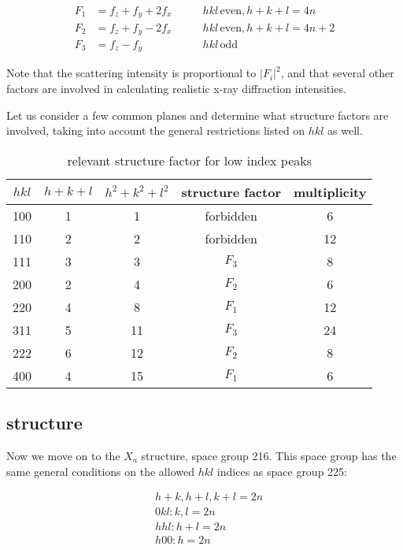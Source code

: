 \documentclass[aps,amsmath,amssymb,prb,superscriptaddress,longtable,preprint,fleqn]{revtex4}
\begin{document}
\begin{align}
F_1 &= f_z + f_y + 2f_x \qquad &hkl\,\text{even}, h+k+l = 4n\\
F_2 &= f_z+ f_y - 2f_x \qquad &hkl\,\text{even}, h+k+l = 4n+2\\
F_3 &= f_z - f_y \qquad &hkl\,\text{odd}
\end{align}

Note that the scattering intensity is proportional to $|F_i|^2$, and that several other factors are involved in calculating realistic x-ray diffraction intensities. 

Let us consider a few common planes and determine what structure factors are involved, taking into account the general restrictions listed on $hkl$ as well.

\begin{table}[htdp]
\begin{center}
\caption{relevant structure factor for low index peaks}
\begin{tabular}{ccccc}
$hkl$ & $h+k+l$ & $h^2+k^2+l^2$ & structure factor & multiplicity \\
\hline
100 & 1 & 1 & forbidden  & 6\\
110 & 2 & 2 & forbidden & 12 \\
111 & 3 & 3 & $F_3$ & 8\\
200 & 2 & 4 & $F_2$ & 6\\
220 & 4 & 8 & $F_1$ & 12\\
311 & 5 & 11 & $F_3$ & 24\\
222 & 6 & 12 & $F_2$ & 8\\
400 & 4 & 15 & $F_1$& 6
\end{tabular}
\end{center}
\label{low-index-l21}
\end{table}%

\clearpage 

\subsection{ structure}

Now we move on to the $X_a$ structure, space group 216. This space group has the same general conditions on the allowed $hkl$ indices as space group 225:

\begin{align*}
 &h+k, h+l, k+l=2n\\
 &0kl: k,l=2n\\
 &hhl: h+l=2n\\
 &h00: h=2n
\end{align*}
\end{document}
